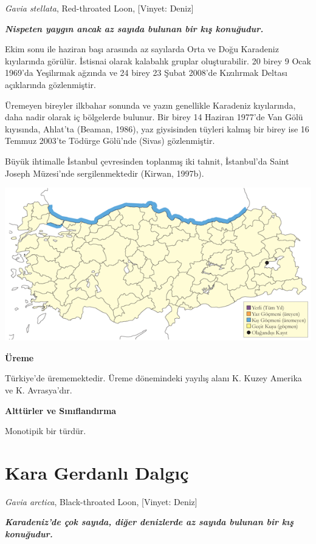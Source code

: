 \documentclass[
  a4paper,
  DIV=11,
  numbers=noendperiod]{scrreprt}
\begin{document}
\emph{Gavia stellata}, Red-throated Loon, {[}Vinyet: Deniz{]}

\textbf{\emph{Nispeten yaygın ancak az sayıda bulunan bir kış
konuğudur.}}

Ekim sonu ile haziran başı arasında az sayılarda Orta ve Doğu Karadeniz
kıyılarında görülür. İstisnai olarak kalabalık gruplar oluşturabilir. 20
birey 9 Ocak 1969'da Yeşilırmak ağzında ve 24 birey 23 Şubat 2008'de
Kızılırmak Deltası açıklarında gözlenmiştir.

Üremeyen bireyler ilkbahar sonunda ve yazın genellikle Karadeniz
kıyılarında, daha nadir olarak iç bölgelerde bulunur. Bir birey 14
Haziran 1977'de Van Gölü kıyısında, Ahlat'ta (Beaman, 1986), yaz
giysisinden tüyleri kalmış bir birey ise 16 Temmuz 2003'te Tödürge
Gölü'nde (Sivas) gözlenmiştir.

Büyük ihtimalle İstanbul çevresinden toplanmış iki tahnit, İstanbul'da
Saint Joseph Müzesi'nde sergilenmektedir (Kirwan, 1997b).

\includegraphics{images/harita_Page_045.png}

\textbf{Üreme}

Türkiye'de ürememektedir. Üreme dönemindeki yayılış alanı K. Kuzey
Amerika ve K. Avrasya'dır.

\textbf{Alttürler ve Sınıflandırma}

Monotipik bir türdür.

\section{Kara Gerdanlı Dalgıç}\label{kara-gerdanlux131-dalgux131uxe7}

\emph{Gavia arctica}, Black-throated Loon, {[}Vinyet: Deniz{]}

\textbf{\emph{Karadeniz'de çok sayıda, diğer denizlerde az sayıda
bulunan bir kış konuğudur.}}
\end{document}
